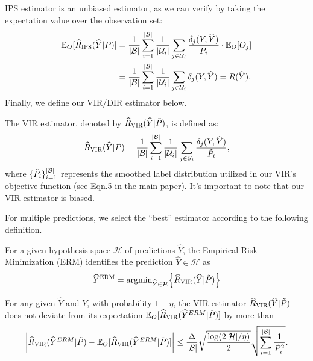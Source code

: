 IPS estimator is an unbiased estimator, as we can verify by taking the expectation value over the observation set:
%
\begin{align*}
    \mathbb{E}_{O} [\hat{R}_{\textsc{IPS}}(\hat{Y} | P)] &= \dfrac{1}{|\mathcal{B}|} \sum_{i=1}^{|\mathcal{B}|} \dfrac{1}{|\mathcal{U}_{i}|} \sum_{j \in \mathcal{U}_{i}} \dfrac{\delta_{j} (Y, \hat{Y})}{P_{i}} \cdot \mathbb{E}_{O} [O_{j}] \\ &= \dfrac{1}{|\mathcal{B}|} \sum_{i=1}^{|\mathcal{B}|} \dfrac{1}{|\mathcal{U}_{i}|} \sum_{j \in \mathcal{U}_{i}} \delta_{j} (Y, \hat{Y}) = R(\hat{Y}).
\end{align*}
%
{Finally, we define our VIR/DIR estimator below.}
\begin{definition}
The VIR estimator, denoted by $\hat{R}_{\textsc{VIR}}(\hat{Y} | \Tilde{P})$, is defined as:
%
\begin{align}
    \hat{R}_{\textsc{VIR}}(\hat{Y} | \Tilde{P}) = \dfrac{1}{|\mathcal{B}|} \sum_{i=1}^{|\mathcal{B}|} \dfrac{1}{|\mathcal{U}_{i}|} \sum_{j \in \mathcal{S}_{i}} \dfrac{\delta_{j} (Y, \hat{Y})}{\Tilde{P}_{i}}, \label{eq:VIR_estimator_supp}
\end{align}
%
where $\{ \Tilde{P}_{i} \}_{i=1}^{|\mathcal{B}|}$ represents the smoothed label distribution utilized in our VIR's objective function (see Eqn.5 in the main paper). It's important to note that our VIR estimator is biased.
\end{definition}
{For multiple predictions, we select the ``best'' estimator according to the following definition.}
\begin{definition} 
For a given hypothesis space $\mathcal{H}$ of predictions $\hat{Y}$, the Empirical Risk Minimization (ERM) identifies the prediction $\hat{Y} \in \mathcal{H}$ as
%
\begin{align*}
    \hat{Y}^{\textsc{ERM}} = \textrm{argmin}_{\hat{Y} \in \mathcal{H}} \Big\{ \hat{R}_{\textsc{VIR}}(\hat{Y} | \Tilde{P}) \Big\}    
\end{align*}
%
\end{definition}
\begin{lemma} \label{lemma:tailbound_supp}
{For any given $\hat{Y}$ and $Y$, with probability $1-\eta$, the VIR estimator $\hat{R}_{\textsc{VIR}} (\hat{Y} | \Tilde{P})$ does not deviate from its expectation $\mathbb{E}_{O} [\hat{R}_{\textsc{VIR}} (\hat{Y}^{ERM} | \Tilde{P})]$ by more than}
\begin{align*}
    \bigg| \hat{R}_{\textsc{VIR}} (\hat{Y}^{ERM} | \Tilde{P}) - \mathbb{E}_{O} [\hat{R}_{\textsc{VIR}} (\hat{Y}^{ERM} | \Tilde{P})] \bigg| \leq \dfrac{\Delta}{|\mathcal{B}|} \sqrt{\dfrac{\log (2 |\mathcal{H}| / \eta)}{2}} \sqrt{\sum_{i=1}^{|\mathcal{B}|} \dfrac{1}{\Tilde{P}_{i}^{2}}}.
\end{align*}
\end{lemma}

